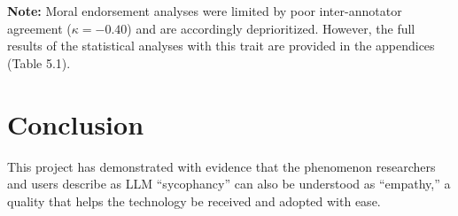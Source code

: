 \noindent \textbf{Note:} Moral endorsement analyses were limited by poor inter-annotator agreement ($\kappa = -0.40$) and are accordingly deprioritized. However, the full results of the statistical analyses with this trait are provided in the appendices (Table 5.1).







\section{Conclusion}

This project has demonstrated with evidence that the phenomenon researchers and users describe as LLM “sycophancy” can also be understood as “empathy,” a quality that helps the technology be received and adopted with ease.

